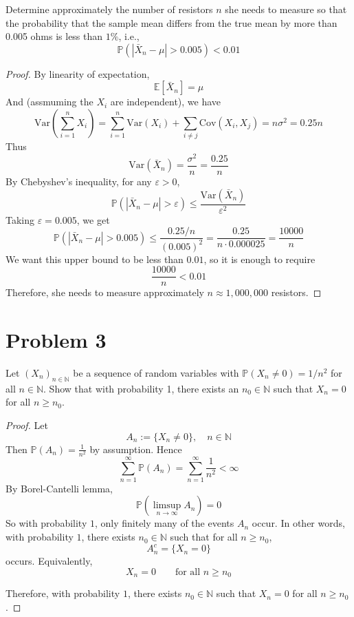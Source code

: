Determine approximately the number of resistors $n$ 
she needs to measure so that the probability that 
the sample mean differs from the true mean by more than 0.005 ohms 
is less than $1 \%$, i.e.,
$$
\mathbb{P}\left(\left|\bar{X}_n-\mu\right|>0.005\right)<0.01
$$
\begin{proof}
By linearity of expectation, 
\[
\mathbb{E}[\bar X_n]=\mu
\]
And (assmuming the \(X_i\) are independent), we have
$$
\mathrm{Var}\left(\sum_{i=1}^n X_i\right) = 
\sum_{i=1}^n \mathrm{Var}(X_i) + 
\sum_{i \neq j} \mathrm{Cov}(X_i, X_j) = n \sigma^2 = 0.25 n
$$
Thus 
\[
\mathrm{Var}(\bar X_n)=\frac{\sigma^2}{n}=\frac{0.25}{n}
\]
By Chebyshev's inequality, for any \(\varepsilon>0\),
\[
\mathbb{P}\left(|\bar X_n-\mu|>\varepsilon\right)
\le \frac{\mathrm{Var}(\bar X_n)}{\varepsilon^2}
\]
Taking \(\varepsilon=0.005\), we get
\[
\mathbb{P}\left(|\bar X_n-\mu|>0.005\right)
\le \frac{0.25/n}{(0.005)^2}
= \frac{0.25}{n\cdot 0.000025}
= \frac{10000}{n}
\]
We want this upper bound to be less than \(0.01\), 
so it is enough to require
\[
\frac{10000}{n}<0.01
\]
Therefore, she needs to measure approximately
\(
n \approx 1{,}000{,}000
\)
resistors.
\end{proof}




\section*{Problem 3}
Let $\left(X_n\right)_{n \in \mathbb{N}}$ be a sequence of random variables 
with $\mathbb{P}\left(X_n \neq 0\right)=1 / n^2$ for all $n \in \mathbb{N}$.
 Show that with probability 1, 
there exists an $n_0 \in \mathbb{N}$ such that $X_n=0$ for all $n \geq n_0$.
\begin{proof}
Let
\[
A_n := \{X_n \neq 0\}, \quad n \in \mathbb{N}
\]
Then
\(
\mathbb{P}(A_n)=\frac{1}{n^2} 
\) by assumption. 
Hence
\[
\sum_{n=1}^\infty \mathbb{P}(A_n)
= \sum_{n=1}^\infty \frac{1}{n^2}
< \infty
\]
By Borel-Cantelli lemma,
\[
\mathbb{P}\left( \limsup_{n \to \infty} A_n \right) = 0
\]
So with probability \(1\), only finitely many of the events \(A_n\) occur. In other words, with probability \(1\), there exists \(n_0 \in \mathbb{N}\) such that for all \(n \ge n_0\),
\[
A_n^c = \{X_n=0\}
\]
occurs. Equivalently,
\[
X_n=0 \qquad \text{for all } n \ge n_0
\]

Therefore, with probability \(1\), there exists \(n_0 \in \mathbb{N}\) such that \(X_n=0\) for all \(n \ge n_0\).
\end{proof}








